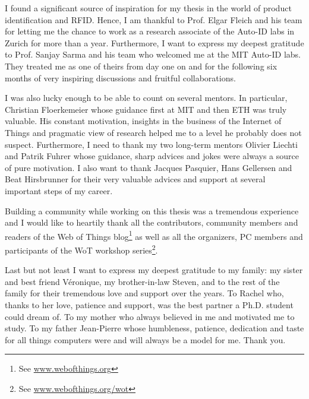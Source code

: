 I found a significant source of inspiration for my thesis in the world of product identification and RFID. Hence, I am thankful to Prof. Elgar Fleich and his team for letting me the chance to work as a research associate of the Auto-ID labs in Zurich for more than a year. Furthermore, I want to express my deepest gratitude to Prof. Sanjay Sarma and his team who welcomed me at the MIT Auto-ID labs. They treated me as one of theirs from day one on and for the following six months of very inspiring discussions and fruitful collaborations.  

I was also lucky enough to be able to count on several mentors. In particular, Christian Floerkemeier whose guidance first at MIT and then ETH was truly valuable. His constant motivation, insights in the business of the Internet of Things and pragmatic view of research helped me to a level he probably does not suspect. Furthermore, I need to thank my two long-term mentors Olivier Liechti and Patrik Fuhrer whose guidance, sharp advices and jokes were always a source of pure motivation. I also want to thank Jacques Pasquier, Hans Gellersen and Beat Hirsbrunner for their very valuable advices and support at several important steps of my career.

Building a community while working on this thesis was a tremendous experience and I would like to heartily thank all the contributors, community members and readers of the Web of Things blog\footnote{See \url{www.webofthings.org}} as well as all the organizers, PC members and participants of the WoT workshop series\footnote{See \url{www.webofthings.org/wot}}.

Last but not least I want to express my deepest gratitude to my family: my sister and best friend V\'{e}ronique, my brother-in-law Steven, and to the rest of the family for their tremendous love and support over the years. To Rachel who, thanks to her love, patience and support, was the best partner a Ph.D. student could dream of. To my mother who always believed in me and motivated me to study. To my father Jean-Pierre whose humbleness, patience, dedication and taste for all things computers were and will always be a model for me. Thank you.

